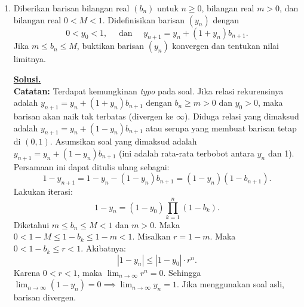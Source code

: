 \documentclass[12pt,twoside]{article}
\newenvironment{solution}
{
	\par\noindent\textbf{\underline{Solusi.}}\\
}
{
	\par
}
\begin{document}
\begin{enumerate}
\begin{solution}
          \textbf{(b)} Diketahui $A\mathbf{x} = \lambda_1 \mathbf{x}$ dan $A\mathbf{y} = \lambda_2 \mathbf{y}$ dengan $\lambda_1 \ne \lambda_2$.
          Persamaan diberikan:
          \[ A\mathbf{x} + A\mathbf{y} = \mu \mathbf{x} - \mu \mathbf{y} \implies \lambda_1 \mathbf{x} + \lambda_2 \mathbf{y} = \mu \mathbf{x} - \mu \mathbf{y}. \]
          Dapat ditulis sebagai $(\lambda_1 - \mu)\mathbf{x} + (\lambda_2 + \mu)\mathbf{y} = \mathbf{0}$.
          Karena $\mathbf{x}$ dan $\mathbf{y}$ adalah vektor eigen yang bersesuaian dengan nilai eigen berbeda, mereka bebas linear.
          Maka koefisiennya harus nol:
          \[ \lambda_1 - \mu = 0 \implies \lambda_1 = \mu. \]
          \[ \lambda_2 + \mu = 0 \implies \lambda_2 = -\mu. \]
          Jadi dua nilai eigen dari $A$ adalah $\mu$ dan $-\mu$.
          Misalkan nilai eigen ketiga adalah $\lambda_3$.
          Pernyataan "nilai eigen dari A adalah entri-entri dari diagonal utama" secara umum berlaku jika $A$ adalah matriks segitiga (atas atau bawah) atau diagonal.
          Dalam konteks soal kompetisi, kemungkinan besar diasumsikan $A$ dapat dibawa ke bentuk segitiga atau diagonal, atau pernyataan ini meminta kita membuktikan bahwa himpunan diagonalnya adalah $\{\mu, -\mu, \lambda_3\}$.
          Jika kita memilih basis vektor eigen (jika $A$ diagonalisable), matriks representasinya diagonal dengan entri $\mu, -\mu, \lambda_3$.
        \end{solution}

  \item Diberikan barisan bilangan real $(b_n)$ untuk $n\ge 0$, bilangan real $m>0$, dan bilangan real $0<M<1$. Didefinisikan barisan $(y_n)$ dengan
        \[
          0 < y_0 < 1,
          \quad \text{ dan }\quad
          y_{n+1} = y_n + (1 + y_n)b_{n+1}.
        \]
        Jika $m \le b_n \le M$, buktikan barisan $(y_n)$ konvergen dan tentukan nilai limitnya.
        \begin{solution}
          \textbf{Catatan:} Terdapat kemungkinan \textit{typo} pada soal. Jika relasi rekurensinya adalah $y_{n+1} = y_n + (1+y_n)b_{n+1}$ dengan $b_n \ge m > 0$ dan $y_0 > 0$, maka barisan akan naik tak terbatas (divergen ke $\infty$).
          Diduga relasi yang dimaksud adalah $y_{n+1} = y_n + (1-y_n)b_{n+1}$ atau serupa yang membuat barisan tetap di $(0,1)$.
          Asumsikan soal yang dimaksud adalah $y_{n+1} = y_n + (1-y_n)b_{n+1}$ (ini adalah rata-rata terbobot antara $y_n$ dan 1).
          Persamaan ini dapat ditulis ulang sebagai:
          \[ 1 - y_{n+1} = 1 - y_n - (1-y_n)b_{n+1} = (1-y_n)(1-b_{n+1}). \]
          Lakukan iterasi:
          \[ 1 - y_n = (1-y_0) \prod_{k=1}^n (1-b_k). \]
          Diketahui $m \le b_n \le M < 1$ dan $m > 0$.
          Maka $0 < 1-M \le 1-b_k \le 1-m < 1$.
          Misalkan $r = 1-m$. Maka $0 < 1-b_k \le r < 1$.
          Akibatnya:
          \[ |1-y_n| \le |1-y_0| \cdot r^n. \]
          Karena $0 < r < 1$, maka $\lim_{n \to \infty} r^n = 0$.
          Sehingga $\lim_{n \to \infty} (1-y_n) = 0 \implies \lim_{n \to \infty} y_n = 1$.
          Jika menggunakan soal asli, barisan divergen.
        \end{solution}


\end{enumerate}
\end{document}
